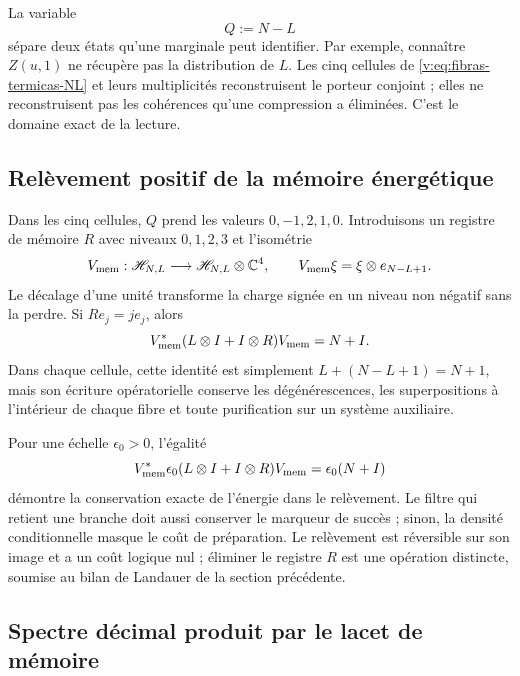 La variable
\begin{equation}
 Q:=N-L
 \label{v:eq:carga-memoria-Q}
\end{equation}
sépare deux états qu’une marginale peut identifier. Par exemple, connaître
$Z(u,1)$ ne récupère pas la distribution de $L$. Les cinq cellules de
\eqref{v:eq:fibras-termicas-NL} et leurs multiplicités reconstruisent le
porteur conjoint ; elles ne reconstruisent pas les cohérences qu’une compression a
éliminées. C’est le domaine exact de la lecture.

\subsection{Relèvement positif de la mémoire énergétique}

Dans les cinq cellules, $Q$ prend les valeurs $0,-1,2,1,0$. Introduisons un
registre de mémoire $R$ avec niveaux $0,1,2,3$ et l’isométrie
\begin{equation}
 V_{\rm mem}:\mathscr H_{N,L}\longrightarrow
 \mathscr H_{N,L}\otimes\mathbb C^4,\qquad
 V_{\rm mem}\xi=\xi\otimes e_{N-L+1}.
 \label{v:eq:isometria-memoria-positiva}
\end{equation}
Le décalage d’une unité transforme la charge signée en un niveau non
négatif sans la perdre. Si $R e_j=j e_j$, alors
\begin{equation}
 V_{\rm mem}^*(L\otimes I+I\otimes R)V_{\rm mem}=N+I.
 \label{v:eq:balance-positivo-memoria}
\end{equation}
Dans chaque cellule, cette identité est simplement
$L+(N-L+1)=N+1$, mais son écriture opératorielle conserve les dégénérescences,
les superpositions à l’intérieur de chaque fibre et toute purification sur un
système auxiliaire.

Pour une échelle $\epsilon_0>0$, l’égalité
\begin{equation}
 V_{\rm mem}^*\epsilon_0(L\otimes I+I\otimes R)V_{\rm mem}
 =\epsilon_0(N+I)
 \label{v:eq:energia-lift-memoria}
\end{equation}
démontre la conservation exacte de l’énergie dans le relèvement. Le filtre qui
retient une branche doit aussi conserver le marqueur de succès ; sinon,
la densité conditionnelle masque le coût de préparation. Le relèvement est
réversible sur son image et a un coût logique nul ; éliminer le registre
$R$ est une opération distincte, soumise au bilan de Landauer de la section
précédente.

\subsection{Spectre décimal produit par le lacet de mémoire}

